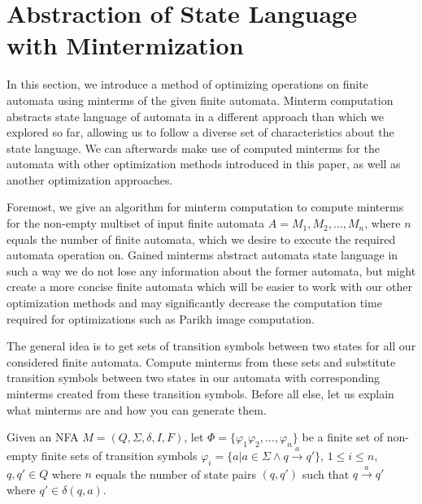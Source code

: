 
\section{Abstraction of State Language with Mintermization}

In this section, we introduce a method of optimizing operations on finite automata using minterms of the given finite automata. Minterm computation abstracts state language of automata in a different approach than which we explored so far, allowing us to follow a diverse set of characteristics about the state language. We can afterwards make use of computed minterms for the automata with other optimization methods introduced in this paper, as well as another optimization approaches.

Foremost, we give an algorithm for minterm computation to compute minterms for the non-empty multiset of input finite automata $A = {M_1, M_2, \dots, M_n}$, where $n$ equals the number of finite automata, which we desire to execute the required automata operation on. Gained minterms abstract automata state language in such a way we do not lose any information about the former automata, but might create a more concise finite automata which will be easier to work with our other optimization methods and may significantly decrease the computation time required for optimizations such as Parikh image computation.

The general idea is to get sets of transition symbols between two states for all our considered finite automata. Compute minterms from these sets and substitute transition symbols between two states in our automata with corresponding minterms created from these transition symbols. Before all else, let us explain what minterms are and how you can generate them.

\begin{definition}
Given an NFA $M = (Q, \Sigma, \delta, I, F)$, let $\Phi = \{ \varphi_1 \varphi_2, \ldots, \varphi_n \}$ be a finite set of non-empty finite sets of transition symbols $\varphi_i = \{ a | a \in \Sigma \land q \xrightarrow{a} q' \}$, $ 1 \leq i \leq n$, $q, q' \in Q$ where $n$ equals the number of state pairs $(q, q')$ such that $q \xrightarrow{a} q'$ where $q' \in \delta(q, a)$.
\end{definition}

